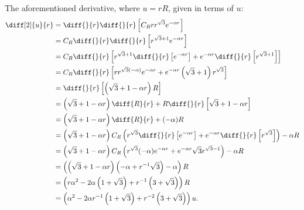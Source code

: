 \documentclass[a4paper, 12pt]{config/homework}
\begin{document}
\pagebreak\noindent
The aforementioned derivative, where \(u=rR\), given in terms of \(u\):
\begin{align*}
\diff[2]{u}{r} &= \diff{}{r}\diff{}{r}\left[C_R rr^{\sqrt{3}}e^{-\alpha r}\right]
\\&= C_R \diff{}{r}\diff{}{r}\left[r^{\sqrt{3}+1}e^{-\alpha r}\right]
\\&= C_R \diff{}{r}\left[r^{\sqrt{3}+1}\diff{}{r}\left[e^{-\alpha r}\right] + e^{-\alpha r}\diff{}{r}\left[r^{\sqrt{3}+1}\right]\right]
\\&= C_R \diff{}{r}\left[rr^{\sqrt{3}(-\alpha)}e^{-\alpha r} + e^{-\alpha r}\left(\sqrt{3}+1\right)r^{\sqrt{3}}\right]
\\&= \diff{}{r}\left[\left(\sqrt{3}+1-\alpha r\right)R\right]
\\&= \left(\sqrt{3}+1-\alpha r\right)\diff{R}{r} + R\diff{}{r}\left[\sqrt{3}+1-\alpha r\right]
\\&= \left(\sqrt{3}+1-\alpha r\right)\diff{R}{r} + (-\alpha)R
\\&= \left(\sqrt{3}+1-\alpha r\right)C_R \left(r^{\sqrt{3}}\diff{}{r}\left[e^{-\alpha r}\right] + e^{-\alpha r}\diff{}{r}\left[r^{\sqrt{3}}\right]\right) -\alpha R
\\&= \left(\sqrt{3}+1-\alpha r\right)C_R \left(r^{\sqrt{3}}(-\alpha)e^{-\alpha r} + e^{-\alpha r}\sqrt{3}r^{\sqrt{3}-1}\right)-\alpha R
\\&= \left( \left(\sqrt{3}+1-\alpha r\right)\left(-\alpha + r^{-1}\sqrt{3}\right) -\alpha\right)R
\\&= \left(r\alpha^2 -2\alpha\left(1 + \sqrt{3}\right) + r^{-1}\left(3 + \sqrt{3}\right)\right)R
\\&= \left(\alpha^2 - 2\alpha r^{-1}\left(1+\sqrt{3}\right) + r^{-2}\left(3+\sqrt{3}\right)\right)u.
\end{align*}
\end{document}
